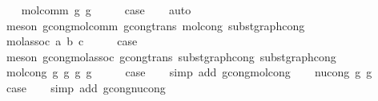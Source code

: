 \begin{isabellebody}
\isamarkupfalse%
\isanewline
\ \ \isamarkupfalse%
\ {\isacharparenleft}{\kern0pt}mol{\isacharunderscore}{\kern0pt}comm\ g{}\ g{}{\isacharparenright}{\kern0pt}\isanewline
\ \ \isamarkupfalse%
\ \isamarkupfalse%
\ {\isacharquery}{\kern0pt}case\isanewline
\ \ \isamarkupfalse%
\ auto\isanewline
\ \ \isamarkupfalse%
\ {\isacharparenleft}{\kern0pt}meson\ gcong{\isachardot}{\kern0pt}mol{\isacharunderscore}{\kern0pt}comm\ gcong{\isachardot}{\kern0pt}trans\ mol{\isacharunderscore}{\kern0pt}cong\ subst{\isacharunderscore}{\kern0pt}graph{\isacharunderscore}{\kern0pt}cong{}{\isacharparenright}{\kern0pt}\isanewline
{}\isamarkupfalse%
\isanewline
\ \ \isamarkupfalse%
\ {\isacharparenleft}{\kern0pt}mol{\isacharunderscore}{\kern0pt}assoc\ a\ b\ c{\isacharparenright}{\kern0pt}\isanewline
\ \ \isamarkupfalse%
\ \isamarkupfalse%
\ {\isacharquery}{\kern0pt}case\isanewline
\ \ \isamarkupfalse%
\ {\isacharparenleft}{\kern0pt}meson\ gcong{\isachardot}{\kern0pt}mol{\isacharunderscore}{\kern0pt}assoc\ gcong{\isachardot}{\kern0pt}trans\ subst{\isacharunderscore}{\kern0pt}graph{\isacharunderscore}{\kern0pt}cong\ subst{\isacharunderscore}{\kern0pt}graph{\isacharunderscore}{\kern0pt}cong{}{\isacharparenright}{\kern0pt}\isanewline
{}\isamarkupfalse%
\isanewline
\ \ \isamarkupfalse%
\ {\isacharparenleft}{\kern0pt}mol{\isacharunderscore}{\kern0pt}cong\ g{}\ g{}{\isacharprime}{\kern0pt}\ g{}\ g{}{\isacharprime}{\kern0pt}{\isacharparenright}{\kern0pt}\isanewline
\ \ \isamarkupfalse%
\ \isamarkupfalse%
\ {\isacharquery}{\kern0pt}case\isanewline
\ \ \isamarkupfalse%
\ {\isacharparenleft}{\kern0pt}simp\ add{\isacharcolon}{\kern0pt}\ gcong{\isachardot}{\kern0pt}mol{\isacharunderscore}{\kern0pt}cong{\isacharparenright}{\kern0pt}\isanewline
{}\isamarkupfalse%
\isanewline
\ \ \isamarkupfalse%
\ {\isacharparenleft}{\kern0pt}nu{\isacharunderscore}{\kern0pt}cong\ g\ g{\isacharprime}{\kern0pt}{\isacharparenright}{\kern0pt}\isanewline
\ \ \isamarkupfalse%
\ \isamarkupfalse%
\ {\isacharquery}{\kern0pt}case\isanewline
\ \ \isamarkupfalse%
\ {\isacharparenleft}{\kern0pt}simp\ add{\isacharcolon}{\kern0pt}\ gcong{\isachardot}{\kern0pt}nu{\isacharunderscore}{\kern0pt}cong{\isacharparenright}{\kern0pt}\isanewline

\end{isabellebody}
